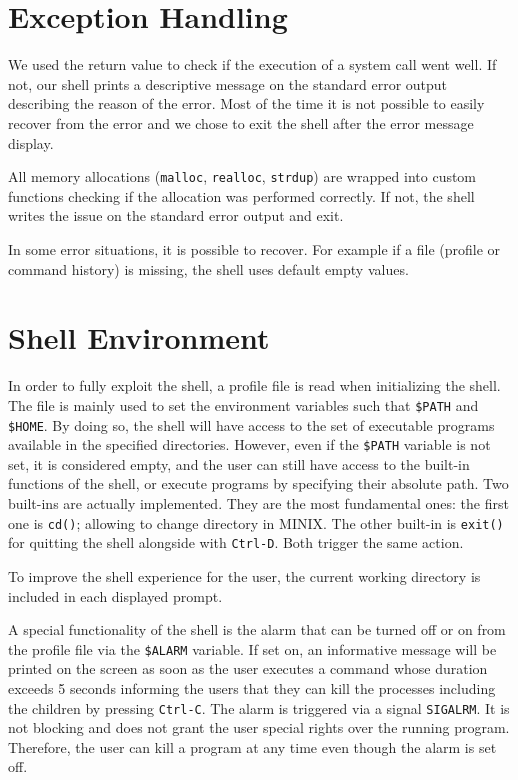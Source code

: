 \documentclass[fleqn]{article}
\begin{document}
\section{Exception Handling}

We used the return value to check if the execution of a system call went well. If not, our shell prints a descriptive message on the standard error output describing the reason of the error. Most of the time it is not possible to easily recover from the error and we chose to exit the shell after the error message display.

All memory allocations (\texttt{malloc}, \texttt{realloc}, \texttt{strdup}) are wrapped into custom functions checking if the allocation was performed correctly. If not, the shell writes the issue on the standard error output and exit.

In some error situations, it is possible to recover. For example if a file (profile or command history) is missing, the shell uses default empty values.

\section{Shell Environment}

In order to fully exploit the shell, a profile file is read when initializing the shell. The file is mainly used to set the environment variables such that \texttt{\$PATH} and \texttt{\$HOME}. By doing so, the shell will have access to the set of executable programs available in the specified directories.
However, even if the \texttt{\$PATH} variable is not set, it is considered empty, and the user can still have access to the built-in functions of the shell, or execute programs by specifying their absolute path. Two built-ins are actually implemented. They are the most fundamental ones: the first one is \texttt{cd()}; allowing to change directory in MINIX. The other built-in is \texttt{exit()} for quitting the shell alongside with \texttt{Ctrl-D}. Both trigger the same action.

To improve the shell experience for the user, the current working directory is included in each displayed prompt.

A special functionality of the shell is the alarm that can be turned off or on from the profile file via the \texttt{\$ALARM} variable. If set on, an informative message will be printed on the screen as soon as the user executes a command whose duration exceeds 5 seconds informing the users that they can kill the processes including the children by pressing \texttt{Ctrl-C}.
The alarm is triggered via a signal \texttt{SIGALRM}. It is not blocking and does not grant the user special rights over the running program. Therefore, the user can kill a program at any time even though the alarm is set off.
\end{document}
